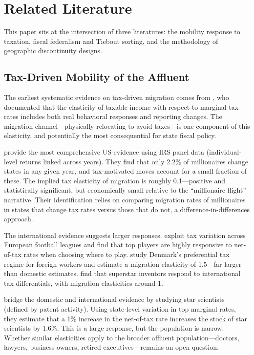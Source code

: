 \documentclass[12pt]{article}
\begin{document}
\section{Related Literature}
\label{sec:lit}

This paper sits at the intersection of three literatures: the mobility response to taxation, fiscal federalism and Tiebout sorting, and the methodology of geographic discontinuity designs.

\subsection{Tax-Driven Mobility of the Affluent}

The earliest systematic evidence on tax-driven migration comes from \citet{feldstein1999tax}, who documented that the elasticity of taxable income with respect to marginal tax rates includes both real behavioral responses and reporting changes. The migration channel---physically relocating to avoid taxes---is one component of this elasticity, and potentially the most consequential for state fiscal policy.

\citet{young2016millionaire} provide the most comprehensive US evidence using IRS panel data (individual-level returns linked across years). They find that only 2.2\% of millionaires change states in any given year, and tax-motivated moves account for a small fraction of these. The implied tax elasticity of migration is roughly 0.1---positive and statistically significant, but economically small relative to the ``millionaire flight'' narrative. Their identification relies on comparing migration rates of millionaires in states that change tax rates versus those that do not, a difference-in-differences approach.

The international evidence suggests larger responses. \citet{kleven2013taxation} exploit tax variation across European football leagues and find that top players are highly responsive to net-of-tax rates when choosing where to play. \citet{kleven2014migration} study Denmark's preferential tax regime for foreign workers and estimate a migration elasticity of 1.5---far larger than domestic estimates. \citet{akcigit2016taxation} find that superstar inventors respond to international tax differentials, with migration elasticities around 1.

\citet{moretti2017effect} bridge the domestic and international evidence by studying star scientists (defined by patent activity). Using state-level variation in top marginal rates, they estimate that a 1\% increase in the net-of-tax rate increases the stock of star scientists by 1.6\%. This is a large response, but the population is narrow. Whether similar elasticities apply to the broader affluent population---doctors, lawyers, business owners, retired executives---remains an open question.
\end{document}
